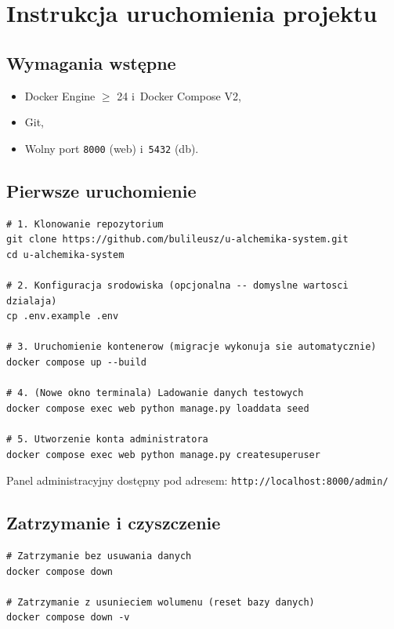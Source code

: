 \documentclass[12pt,a4paper]{article}
\begin{document}
\section{Instrukcja uruchomienia projektu}

\subsection{Wymagania wstępne}

\begin{itemize}[nosep]
  \item Docker Engine $\geq$ 24 i~Docker Compose V2,
  \item Git,
  \item Wolny port \texttt{8000} (web) i~\texttt{5432} (db).
\end{itemize}

\subsection{Pierwsze uruchomienie}

\begin{lstlisting}[style=consolestyle, caption={Sekwencja uruchomienia}]
# 1. Klonowanie repozytorium
git clone https://github.com/bulileusz/u-alchemika-system.git
cd u-alchemika-system

# 2. Konfiguracja srodowiska (opcjonalna -- domyslne wartosci dzialaja)
cp .env.example .env

# 3. Uruchomienie kontenerow (migracje wykonuja sie automatycznie)
docker compose up --build

# 4. (Nowe okno terminala) Ladowanie danych testowych
docker compose exec web python manage.py loaddata seed

# 5. Utworzenie konta administratora
docker compose exec web python manage.py createsuperuser
\end{lstlisting}

Panel administracyjny dostępny pod adresem:
\texttt{http://localhost:8000/admin/}

\subsection{Zatrzymanie i czyszczenie}

\begin{lstlisting}[style=consolestyle, caption={Zatrzymanie kontenerów}]
# Zatrzymanie bez usuwania danych
docker compose down

# Zatrzymanie z usunieciem wolumenu (reset bazy danych)
docker compose down -v
\end{lstlisting}
\end{document}
